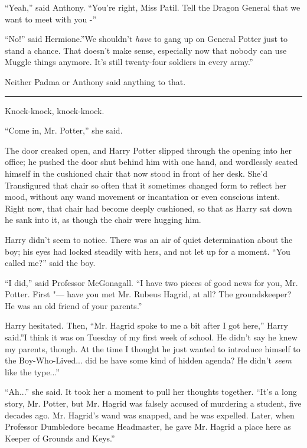 ``Yeah,'' said Anthony. ``You're right, Miss Patil. Tell the Dragon
General that we want to meet with you -''

``No!'' said Hermione.''We shouldn't \emph{have} to gang up on General
Potter just to stand a chance. That doesn't make sense, especially now
that nobody can use Muggle things anymore. It's still twenty-four
soldiers in every army.''

Neither Padma or Anthony said anything to that.

\begin{center}\rule{3in}{0.4pt}\end{center}

Knock-knock, knock-knock.

``Come in, Mr. Potter,'' she said.

The door creaked open, and Harry Potter slipped through the opening into
her office; he pushed the door shut behind him with one hand, and
wordlessly seated himself in the cushioned chair that now stood in front
of her desk. She'd Transfigured that chair so often that it sometimes
changed form to reflect her mood, without any wand movement or
incantation or even conscious intent. Right now, that chair had become
deeply cushioned, so that as Harry sat down he sank into it, as though
the chair were hugging him.

Harry didn't seem to notice. There was an air of quiet determination
about the boy; his eyes had locked steadily with hers, and not let up
for a moment. ``You called me?'' said the boy.

``I did,'' said Professor McGonagall. ``I have two pieces of good news
for you, Mr. Potter. First "--- have you met Mr. Rubeus Hagrid, at all? The
groundskeeper? He was an old friend of your parents.''

Harry hesitated. Then, ``Mr. Hagrid spoke to me a bit after I got
here,'' Harry said.''I think it was on Tuesday of my first week of
school. He didn't say he knew my parents, though. At the time I thought
he just wanted to introduce himself to the Boy-Who-Lived... did he
have some kind of hidden agenda? He didn't \emph{seem} like the
type...''

``Ah...'' she said. It took her a moment to pull her thoughts
together. ``It's a long story, Mr. Potter, but Mr. Hagrid was falsely
accused of murdering a student, five decades ago. Mr. Hagrid's wand was
snapped, and he was expelled. Later, when Professor Dumbledore became
Headmaster, he gave Mr. Hagrid a place here as Keeper of Grounds and
Keys.''

